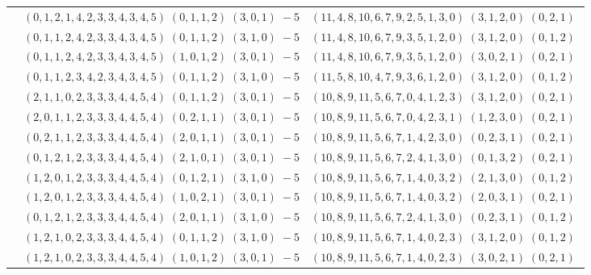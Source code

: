 \documentclass[11pt]{article}
\begin{document}
\begin{longtable}[l]{|c|c|c|}
 \cline{2-3} 
 & $(0 ,1 ,2 ,1 ,4 ,2 ,3 ,3 ,4 ,3 ,4 ,5) \;(0 ,1 ,1 ,2) \;(3 ,0 ,1) \;-5$ & $(11 ,4 ,8 ,10 ,6 ,7 ,9 ,2 ,5 ,1 ,3 ,0) \;(3 ,1 ,2 ,0) \;(0 ,2 ,1) \;$\\ 
 \cline{2-3} 
 & $(0 ,1 ,1 ,2 ,4 ,2 ,3 ,3 ,4 ,3 ,4 ,5) \;(0 ,1 ,1 ,2) \;(3 ,1 ,0) \;-5$ & $(11 ,4 ,8 ,10 ,6 ,7 ,9 ,3 ,5 ,1 ,2 ,0) \;(3 ,1 ,2 ,0) \;(0 ,1 ,2) \;$\\ 
 \cline{2-3} 
 & $(0 ,1 ,1 ,2 ,4 ,2 ,3 ,3 ,4 ,3 ,4 ,5) \;(1 ,0 ,1 ,2) \;(3 ,0 ,1) \;-5$ & $(11 ,4 ,8 ,10 ,6 ,7 ,9 ,3 ,5 ,1 ,2 ,0) \;(3 ,0 ,2 ,1) \;(0 ,2 ,1) \;$\\ 
 \cline{2-3} 
 & $(0 ,1 ,1 ,2 ,3 ,4 ,2 ,3 ,4 ,3 ,4 ,5) \;(0 ,1 ,1 ,2) \;(3 ,1 ,0) \;-5$ & $(11 ,5 ,8 ,10 ,4 ,7 ,9 ,3 ,6 ,1 ,2 ,0) \;(3 ,1 ,2 ,0) \;(0 ,1 ,2) \;$\\ 
 \cline{2-3} 
 & $(2 ,1 ,1 ,0 ,2 ,3 ,3 ,3 ,4 ,4 ,5 ,4) \;(0 ,1 ,1 ,2) \;(3 ,0 ,1) \;-5$ & $(10 ,8 ,9 ,11 ,5 ,6 ,7 ,0 ,4 ,1 ,2 ,3) \;(3 ,1 ,2 ,0) \;(0 ,2 ,1) \;$\\ 
 \cline{2-3} 
 & $(2 ,0 ,1 ,1 ,2 ,3 ,3 ,3 ,4 ,4 ,5 ,4) \;(0 ,2 ,1 ,1) \;(3 ,0 ,1) \;-5$ & $(10 ,8 ,9 ,11 ,5 ,6 ,7 ,0 ,4 ,2 ,3 ,1) \;(1 ,2 ,3 ,0) \;(0 ,2 ,1) \;$\\ 
 \cline{2-3} 
 & $(0 ,2 ,1 ,1 ,2 ,3 ,3 ,3 ,4 ,4 ,5 ,4) \;(2 ,0 ,1 ,1) \;(3 ,0 ,1) \;-5$ & $(10 ,8 ,9 ,11 ,5 ,6 ,7 ,1 ,4 ,2 ,3 ,0) \;(0 ,2 ,3 ,1) \;(0 ,2 ,1) \;$\\ 
 \cline{2-3} 
 & $(0 ,1 ,2 ,1 ,2 ,3 ,3 ,3 ,4 ,4 ,5 ,4) \;(2 ,1 ,0 ,1) \;(3 ,0 ,1) \;-5$ & $(10 ,8 ,9 ,11 ,5 ,6 ,7 ,2 ,4 ,1 ,3 ,0) \;(0 ,1 ,3 ,2) \;(0 ,2 ,1) \;$\\ 
 \cline{2-3} 
 & $(1 ,2 ,0 ,1 ,2 ,3 ,3 ,3 ,4 ,4 ,5 ,4) \;(0 ,1 ,2 ,1) \;(3 ,1 ,0) \;-5$ & $(10 ,8 ,9 ,11 ,5 ,6 ,7 ,1 ,4 ,0 ,3 ,2) \;(2 ,1 ,3 ,0) \;(0 ,1 ,2) \;$\\ 
 \cline{2-3} 
 & $(1 ,2 ,0 ,1 ,2 ,3 ,3 ,3 ,4 ,4 ,5 ,4) \;(1 ,0 ,2 ,1) \;(3 ,0 ,1) \;-5$ & $(10 ,8 ,9 ,11 ,5 ,6 ,7 ,1 ,4 ,0 ,3 ,2) \;(2 ,0 ,3 ,1) \;(0 ,2 ,1) \;$\\ 
 \cline{2-3} 
 & $(0 ,1 ,2 ,1 ,2 ,3 ,3 ,3 ,4 ,4 ,5 ,4) \;(2 ,0 ,1 ,1) \;(3 ,1 ,0) \;-5$ & $(10 ,8 ,9 ,11 ,5 ,6 ,7 ,2 ,4 ,1 ,3 ,0) \;(0 ,2 ,3 ,1) \;(0 ,1 ,2) \;$\\ 
 \cline{2-3} 
 & $(1 ,2 ,1 ,0 ,2 ,3 ,3 ,3 ,4 ,4 ,5 ,4) \;(0 ,1 ,1 ,2) \;(3 ,1 ,0) \;-5$ & $(10 ,8 ,9 ,11 ,5 ,6 ,7 ,1 ,4 ,0 ,2 ,3) \;(3 ,1 ,2 ,0) \;(0 ,1 ,2) \;$\\ 
 \cline{2-3} 
 & $(1 ,2 ,1 ,0 ,2 ,3 ,3 ,3 ,4 ,4 ,5 ,4) \;(1 ,0 ,1 ,2) \;(3 ,0 ,1) \;-5$ & $(10 ,8 ,9 ,11 ,5 ,6 ,7 ,1 ,4 ,0 ,2 ,3) \;(3 ,0 ,2 ,1) \;(0 ,2 ,1) \;$\\ 

\end{longtable}
\end{document}
